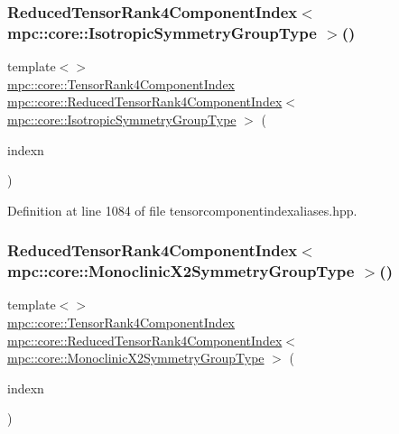 \subsubsection{\texorpdfstring{Reduced\+Tensor\+Rank4\+Component\+Index$<$ mpc\+::core\+::\+Isotropic\+Symmetry\+Group\+Type $>$()}{ReducedTensorRank4ComponentIndex< mpc::core::IsotropicSymmetryGroupType >()}}
{\footnotesize\ttfamily template$<$$>$ \\
\mbox{\hyperlink{namespacempc_1_1core_a54c081f41b2475abd10182bf023805d2}{mpc\+::core\+::\+Tensor\+Rank4\+Component\+Index}} \mbox{\hyperlink{namespacempc_1_1core_ae67b259d682419c12fa2e072049d20ad}{mpc\+::core\+::\+Reduced\+Tensor\+Rank4\+Component\+Index}}$<$ \mbox{\hyperlink{structmpc_1_1core_1_1_isotropic_symmetry_group_type}{mpc\+::core\+::\+Isotropic\+Symmetry\+Group\+Type}} $>$ (\begin{DoxyParamCaption}\item[{const \mbox{\hyperlink{namespacempc_1_1core_a54c081f41b2475abd10182bf023805d2}{mpc\+::core\+::\+Tensor\+Rank4\+Component\+Index}} \&}]{indexn }\end{DoxyParamCaption})\hspace{0.3cm}{\ttfamily [inline]}}



Definition at line 1084 of file tensorcomponentindexaliases.\+hpp.

\mbox{\label{namespacempc_1_1core_aacad83184cf6ca9921da2fa10cdb3ead}} 
\subsubsection{\texorpdfstring{Reduced\+Tensor\+Rank4\+Component\+Index$<$ mpc\+::core\+::\+Monoclinic\+X2\+Symmetry\+Group\+Type $>$()}{ReducedTensorRank4ComponentIndex< mpc::core::MonoclinicX2SymmetryGroupType >()}}
{\footnotesize\ttfamily template$<$$>$ \\
\mbox{\hyperlink{namespacempc_1_1core_a54c081f41b2475abd10182bf023805d2}{mpc\+::core\+::\+Tensor\+Rank4\+Component\+Index}} \mbox{\hyperlink{namespacempc_1_1core_ae67b259d682419c12fa2e072049d20ad}{mpc\+::core\+::\+Reduced\+Tensor\+Rank4\+Component\+Index}}$<$ \mbox{\hyperlink{structmpc_1_1core_1_1_monoclinic_x2_symmetry_group_type}{mpc\+::core\+::\+Monoclinic\+X2\+Symmetry\+Group\+Type}} $>$ (\begin{DoxyParamCaption}\item[{const \mbox{\hyperlink{namespacempc_1_1core_a54c081f41b2475abd10182bf023805d2}{mpc\+::core\+::\+Tensor\+Rank4\+Component\+Index}} \&}]{indexn }\end{DoxyParamCaption})\hspace{0.3cm}{\ttfamily [inline]}}



